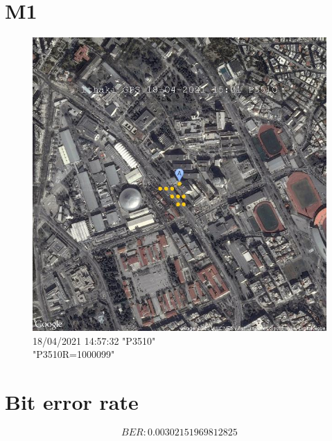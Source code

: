 \documentclass[hidelinks, 12pt, a4paper]{article}
\begin{document}
\pagebreak

\section{M1}

\begin{figure}[h!]
\centering
	\includegraphics[keepaspectratio, width=.8\textwidth]{gps.jpg}
    \caption{18/04/2021 14:57:32 "P3510" \\ "P3510R=1000099"} 
\end{figure}


\section{Bit error rate}

\[BER:0.00302151969812825\]
\end{document}
